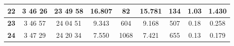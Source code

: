 \documentclass[12pt]{article}
\begin{document}
\begin{table}[H]
{\begin{tabular}{|c|c|c|c|c|c|c|c|c|}
        \textbf{22}   & 3  46  26                                                        & 23  49  58                                                         & 16.807     & 82                                                         & 15.781     & 134                                                        & 1.03         & 1.430                                                            \\ \hline
        \textbf{23}   & 3  46  57                                                        & 24  04  51                                                         & 9.343      & 604                                                        & 9.168      & 507                                                        & 0.18         & 0.258                                                            \\ \hline
        \textbf{24}   & 3  47  29                                                        & 24  20  34                                                         & 7.550      & 1068                                                       & 7.421      & 655                                                        & 0.13         & 0.179                                                            \\ \hline
        \end{tabular}
    }
    \label{tab:1}
\end{table}
\end{document}
